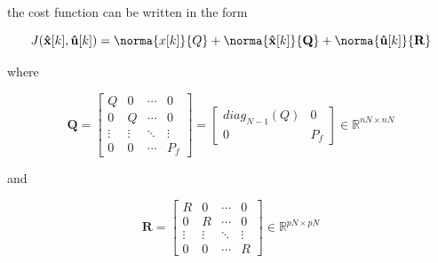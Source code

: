 \noindent
the cost function can be written in the form

\noindent
\begin{equation}
    J(\mathbf{\hat{x}}[k], \mathbf{\hat{u}}[k]) = \norma{x[k]}{Q} + 
    \norma{\mathbf{\hat{x}}[k]}{\mathbf{Q}} + \norma{\mathbf{\hat{u}}[k]}{\mathbf{R}}
\end{equation}

\noindent
where

\begin{equation}
    \mathbf{Q} = 
    \left[
        \begin{matrix}
            Q & 0 & \cdots & 0 \\
            0 & Q & \cdots & 0 \\
            \vdots & \vdots & \ddots & \vdots \\
            0 & 0 & \cdots & P_f
        \end{matrix}
    \right]
    = 
    \left[
        \begin{matrix}
            diag_{N-1}(Q) & 0 \\
            0 & P_f
        \end{matrix}
    \right]
    \in \mathbb{R}^{nN \times nN}
\end{equation}

\noindent
and

\begin{equation}
    \mathbf{R} = 
    \left[
        \begin{matrix}
        R & 0 & \dotsm & 0 \\
        0 & R & \dotsm & 0 \\
        \vdots & \vdots & \ddots & \vdots \\
        0 & 0 & \dotsm & R
        \end{matrix}
    \right] \in \mathbb{R}^{pN \times pN}
\end{equation}
